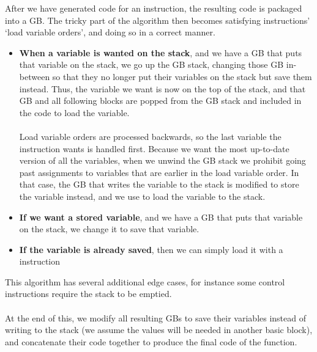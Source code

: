 After we have generated code for an instruction, the resulting code is packaged into a GB. The tricky part of the algorithm then becomes satisfying instructions' `load variable orders', and doing so in a correct manner.
\begin{itemize}
\item \textbf{When a variable is wanted on the stack}, and we have a GB that puts that variable on the stack, we go up the GB stack, changing those GB in-between so that they no longer put their variables on the stack but save them instead. Thus, the variable we want is now on the top of the stack, and that GB and all following blocks are popped from the GB stack and included in the code to load the variable.
\\\\
Load variable orders are processed backwards, so the last variable the instruction wants is handled first. Because we want the most up-to-date version of all the variables, when we unwind the GB stack we prohibit going past assignments to variables that are earlier in the load variable order. In that case, the GB that writes the variable to the stack is modified to store the variable instead, and we use  to load the variable to the stack.
\item \textbf{If we want a stored variable}, and we have a GB that puts that variable on the stack, we change it to save that variable.
\item \textbf{If the variable is already saved}, then we can simply load it with a  instruction
\end{itemize}
This algorithm has several additional edge cases, for instance some control instructions require the stack to be emptied.
\\\\
At the end of this, we modify all resulting GBs to save their variables instead of writing to the stack (we assume the values will be needed in another basic block), and concatenate their code together to produce the final code of the function.


